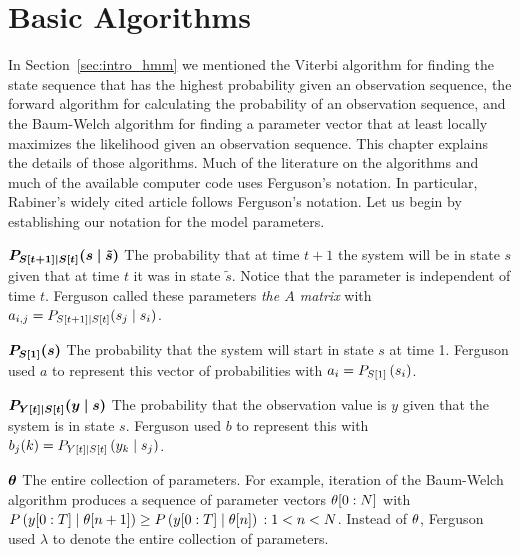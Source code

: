 \chapter{Basic Algorithms}
\label{chap:algorithms}

In Section~\ref{sec:intro_hmm} we mentioned the Viterbi algorithm for
finding the state sequence that has the highest probability given an
observation sequence, the forward algorithm for calculating the
probability of an observation sequence, and the Baum-Welch algorithm
for finding a parameter vector that at least locally maximizes the
likelihood given an observation sequence.  This chapter explains the
details of those algorithms.  Much of the literature on the algorithms
and much of the available computer code uses Ferguson's
\cite{Ferguson80} notation.  In particular, Rabiner's \cite{Rabiner89}
widely cited article follows Ferguson's notation.  Let us begin by
establishing our notation for the model parameters.
\setlength{\nomlabelwidth}{2.7cm}%
\begin{symbdescription}
\item[$\bm{P_{{S}{[t+1]}\mid {S}{[t]}}(s\mid {\tilde s})}$] The probability
  that at time $t+1$ the system will be in state $s$ given that at
  time $t$ it was in state ${\tilde s}$.  Notice that the parameter is
  independent of time $t$.  Ferguson called these parameters \emph{the
    $A$ matrix} with
  $a_{i,j} = P_{{S}{[t+1]}\mid {S}{[t]}}(s_j\mid s_i)$.
\item[$\bm{P_{{S}{[1]}}(s)}$] The probability that the system will
  start in state $s$ at time 1.  Ferguson used $a$ to represent this
  vector of probabilities with $a_i = P_{{S}{[1]}} \left(s_i \right)$.
\item[$\bm{P_{{Y}{[t]}\mid {S}{[t]}}(y\mid s)}$] The probability
  that the observation value is $y$ given that the system is in
  state $s$.  Ferguson used $b$ to represent this with
  $b_j(k) = P_{{Y}{[t]}\mid {S}{[t]}} \left(y_k\mid s_j \right)$.
\item[$\bm{\theta}$] The entire collection of parameters.  For
  example, iteration of the Baum-Welch algorithm produces a sequence
  of parameter vectors $\theta[0:N]$ with
  $P\left(y[0:T]\mid {\theta}{[n+1]}\right) \geq
  P\left(y[0:T]\mid {\theta}{[n]}\right)\, : 1 < n < N$.
  Instead of $\theta$, Ferguson used $\lambda$ to denote the
  entire collection of parameters.
\end{symbdescription}

